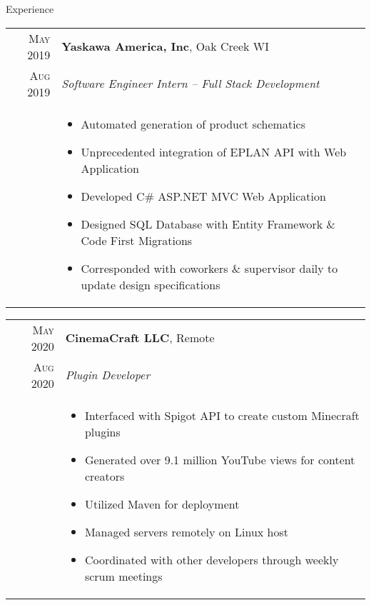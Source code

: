 \documentclass{resume}
\begin{document}
\begin{rSection}{Experience}
\small
{
    \begin{tabular}{r|p{15cm}}
        \textsc{May 2019} & \textbf{Yaskawa America, Inc}, Oak Creek WI \\
        \textsc{Aug 2019}  & \textit{Software Engineer Intern – Full Stack Development} \\ &
        \begin{itemize}
            \item {Automated generation of product schematics}
            \item {Unprecedented integration of EPLAN API with Web Application}
            \item {Developed C\# ASP.NET MVC Web Application}
            \item {Designed SQL Database with Entity Framework \& Code First Migrations}
            \item {Corresponded with coworkers \& supervisor daily to update design specifications}
        \end{itemize}
    \end{tabular}

    \begin{tabular}{r|p{15cm}}
        \textsc{May 2020} & \textbf{CinemaCraft LLC}, Remote \\
        \textsc{Aug 2020}  & \textit{Plugin Developer} \\ &
        \begin{itemize}
            \item {Interfaced with Spigot API to create custom Minecraft plugins}
            \item {Generated over 9.1 million YouTube views for content creators}
            \item {Utilized Maven for deployment}
            \item {Managed servers remotely on Linux host}
            \item {Coordinated with other developers through weekly scrum meetings}
        \end{itemize}
    \end{tabular}

}
\end{rSection}
\end{document}
